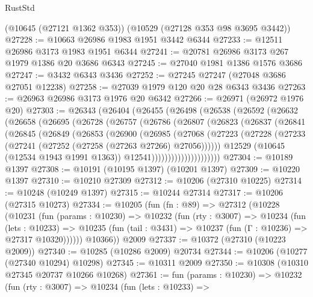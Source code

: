 \begin{lexlean}{RustStd}
\begin{coremodule}
    (@10645 (@27121 @1362 @353))
    (@10529 (@27128 @353 @98 @3695 @3442))
@27228 := @10663 @26986 @1983 @1951 @3442 @6344
@27233 := @12511 @26986 @3173 @1983 @1951 @6344
@27241 := @20781 @26986 @3173 @267 @1979 @1386 @20 @3686 @6343
@27245 := @27040 @1981 @1386 @1576 @3686
@27247 := @3432 @6343 @3436
@27252 := @27245 @27247 (@27048 @3686 @27051 @12238)
@27258 := @27039 @1979 @120 @20 @28 @6343 @3436
@27263 := @26963 @26986 @3173 @1976 @20 @6342
@27266 := @26971 (@26972 @1976 @20)
@27303 := @26343
    (@26404
      (@26455
        (@26498
          (@26538
            (@26592
              (@26632
                (@26658
                  (@26695
                    (@26728
                      (@26757
                        (@26786
                          (@26807
                            (@26823
                              (@26837
                                (@26841
                                  (@26845
                                    (@26849
                                      (@26853
                                        (@26900
                                          (@26985
                                            (@27068
                                              (@27223
                                                (@27228
                                                  (@27233
                                                    (@27241
                                                      (@27252 (@27258 (@27263 @27266) @27056))))))
                                              @12529
                                              (@10645 (@12534 @1943 @1991 @1363))
                                              @12541)))))))))))))))))))))
@27304 := @10189 @1397
@27308 := @10191 (@10195 @1397) (@10201 @1397)
@27309 := @10220 @1397
@27310 := @10210 @27309
@27312 := @10206 (@27310 @10225)
@27314 := @10248 (@10249 @1397)
@27315 := @10244 @27314
@27317 := @10206 (@27315 @10273)
@27334 := @10205
    (fun (fn : @89) =>
    @27312
      (@10228
        (@10231
          (fun (params : @10230) =>
          @10232
            (fun (rty : @3007) =>
            @10234
              (fun (lets : @10233) =>
              @10235 (fun (tail : @3431) => @10237 (fun (Γ : @10236) => @27317 @10320))))))
        @10366))
    @2009
@27337 := @10372 (@27310 (@10223 @2009))
@27340 := @10285 (@10286 @2009) @20734
@27344 := @10206 (@10277 (@27340 @10294) @10298)
@27345 := @10311 @2009
@27350 := @10308 (@10310 @27345 @20737 @10266 @10268)
@27361 := fun (params : @10230) =>
  @10232
    (fun (rty : @3007) =>
    @10234
      (fun (lets : @10233) =>

\end{coremodule}
\end{lexlean}
